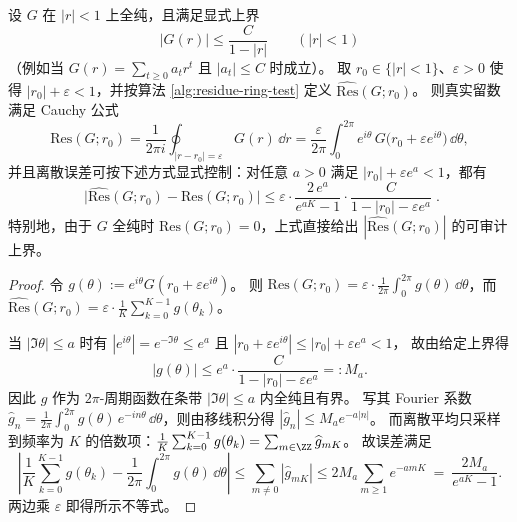 \begin{proposition}[离散留数估计的显式误差界（由 \texorpdfstring{$|G(r)|\le C/(1-|r|)$}{|G(r)|<=C/(1-|r|)} 给出）]\label{prop:residue-ring-explicit-error-bound}
设 \(G\) 在 \(|r|<1\) 上全纯，且满足显式上界
\[
|G(r)|\le \frac{C}{1-|r|}\qquad(|r|<1)
\]
（例如当 \(G(r)=\sum_{t\ge 0}a_t r^t\) 且 \(|a_t|\le C\) 时成立）。
取 \(r_0\in\{|r|<1\}\)、\(\varepsilon>0\) 使得 \(|r_0|+\varepsilon<1\)，并按算法 \ref{alg:residue-ring-test} 定义 \(\widehat{\mathrm{Res}}(G;r_0)\)。
则真实留数满足 Cauchy 公式
\[
\mathrm{Res}(G;r_0)=\frac{1}{2\pi i}\oint_{|r-r_0|=\varepsilon}G(r)\,\dd r
=\frac{\varepsilon}{2\pi}\int_0^{2\pi} e^{i\theta}\,G\!\bigl(r_0+\varepsilon e^{i\theta}\bigr)\,\dd\theta,
\]
并且离散误差可按下述方式显式控制：对任意 \(a>0\) 满足 \(|r_0|+\varepsilon e^{a}<1\)，都有
\[
\boxed{\;
\bigl|\widehat{\mathrm{Res}}(G;r_0)-\mathrm{Res}(G;r_0)\bigr|
\le
\varepsilon\cdot
\frac{2\,e^{a}}{e^{aK}-1}\cdot
\frac{C}{1-|r_0|-\varepsilon e^{a}}\; }.
\]
特别地，由于 \(G\) 全纯时 \(\mathrm{Res}(G;r_0)=0\)，上式直接给出
\(
|\widehat{\mathrm{Res}}(G;r_0)|
\)
的可审计上界。
\end{proposition}
\begin{proof}
令 \(g(\theta):=e^{i\theta}G(r_0+\varepsilon e^{i\theta})\)。
则 \(\mathrm{Res}(G;r_0)=\varepsilon\cdot \frac{1}{2\pi}\int_0^{2\pi}g(\theta)\,\dd\theta\)，而 \(\widehat{\mathrm{Res}}(G;r_0)=\varepsilon\cdot \frac{1}{K}\sum_{k=0}^{K-1}g(\theta_k)\)。
\par
当 \(|\Im\theta|\le a\) 时有 \(|e^{i\theta}|=e^{-\Im\theta}\le e^{a}\) 且
\(
|r_0+\varepsilon e^{i\theta}|
\le
|r_0|+\varepsilon e^{a}
<1
\)，
故由给定上界得
\[
|g(\theta)|\le e^{a}\cdot \frac{C}{1-|r_0|-\varepsilon e^{a}}
 =: M_a.
\]
因此 \(g\) 作为 \(2\pi\)-周期函数在条带 \(|\Im\theta|\le a\) 内全纯且有界。
写其 Fourier 系数 \(\widehat g_n=\frac{1}{2\pi}\int_0^{2\pi} g(\theta)\,e^{-in\theta}\,\dd\theta\)，则由移线积分得
\(
|\widehat g_n|\le M_a e^{-a|n|}
\)。
而离散平均只采样到频率为 \(K\) 的倍数项：\(\frac{1}{K}\sum_{k=0}^{K-1} g(\theta_k)=\sum_{m\in\ZZ}\widehat g_{mK}\)。
故误差满足
\[
\left|
\frac{1}{K}\sum_{k=0}^{K-1} g(\theta_k)-\frac{1}{2\pi}\int_0^{2\pi}g(\theta)\,\dd\theta
\right|
\le
\sum_{m\ne 0} |\widehat g_{mK}|
\le
2M_a\sum_{m\ge 1} e^{-amK}
\ =\ \frac{2M_a}{e^{aK}-1}.
\]
两边乘 \(\varepsilon\) 即得所示不等式。
\end{proof}

